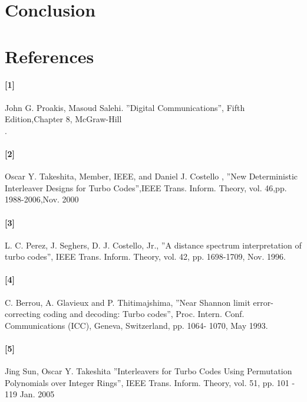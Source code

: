 \documentclass[20 pts]{article}
\begin{document}
\section{Conclusion}

\section{References}
\paragraph{[1]}   John G. Proakis, Masoud Salehi. ''Digital Communications'', 
Fifth Edition,Chapter 8, McGraw-Hill\\.
\paragraph{[2]}  Oscar Y. Takeshita, Member, IEEE, and Daniel J. Costello ,
''New Deterministic Interleaver Designs for Turbo Codes'',IEEE Trans. Inform. 
Theory, vol.  46,pp. 1988-2006,Nov. 2000\\
\paragraph{[3]}  L. C. Perez, J. Seghers, D. J. Costello, Jr.,
 ''A distance spectrum interpretation of turbo codes'', IEEE Trans. Inform. Theory, 
 vol. 42, pp. 1698-1709, Nov. 1996.\\
\paragraph{[4]}  C. Berrou, A. Glavieux and P. Thitimajshima, 
''Near Shannon limit error-correcting coding and
decoding: Turbo codes'', Proc. Intern. Conf. Communications (ICC), Geneva, 
Switzerland, pp. 1064-
1070, May 1993. \\
\paragraph{[5]}  Jing Sun, Oscar Y. Takeshita ''Interleavers for Turbo Codes Using 
Permutation Polynomials over Integer Rings'', IEEE Trans. Inform. Theory, vol. 51, 
pp. 101 - 119  Jan. 2005\\
\end{document}
